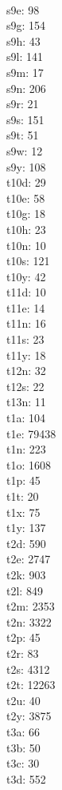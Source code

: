 \begin{multicols}{8}
  \\s9e: 98
  \\s9g: 154
  \\s9h: 43
  \\s9l: 141
  \\s9m: 17
  \\s9n: 206
  \\s9r: 21
  \\s9s: 151
  \\s9t: 51
  \\s9w: 12
  \\s9y: 108
  \\t10d: 29
  \\t10e: 58
  \\t10g: 18
  \\t10h: 23
  \\t10n: 10
  \\t10s: 121
  \\t10y: 42
  \\t11d: 10
  \\t11e: 14
  \\t11n: 16
  \\t11s: 23
  \\t11y: 18
  \\t12n: 32
  \\t12s: 22
  \\t13n: 11
  \\t1a: 104
  \\t1e: 79438
  \\t1n: 223
  \\t1o: 1608
  \\t1p: 45
  \\t1t: 20
  \\t1x: 75
  \\t1y: 137
  \\t2d: 590
  \\t2e: 2747
  \\t2k: 903
  \\t2l: 849
  \\t2m: 2353
  \\t2n: 3322
  \\t2p: 45
  \\t2r: 83
  \\t2s: 4312
  \\t2t: 12263
  \\t2u: 40
  \\t2y: 3875
  \\t3a: 66
  \\t3b: 50
  \\t3c: 30
  \\t3d: 552

\end{multicols}
